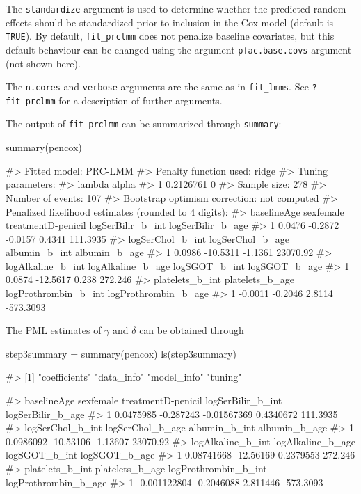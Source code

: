 The \texttt{standardize} argument is used to determine whether the
predicted random effects should be standardized prior to inclusion in
the Cox model (default is \texttt{TRUE}). By default,
\texttt{fit\_prclmm} does not penalize baseline covariates, but this
default behaviour can be changed using the argument
\texttt{pfac.base.covs} argument (not shown here).

The \texttt{n.cores} and \texttt{verbose} arguments are the same as in
\texttt{fit\_lmms}. See \texttt{?fit\_prclmm} for a description of
further arguments.

The output of \texttt{fit\_prclmm} can be summarized through
\texttt{summary}:

\begin{Schunk}
\begin{Sinput}
summary(pencox)
\end{Sinput}
\begin{Soutput}
#> Fitted model: PRC-LMM
#> Penalty function used: ridge
#> Tuning parameters:
#>      lambda alpha
#> 1 0.2126761     0
#> Sample size: 278
#> Number of events: 107
#> Bootstrap optimism correction: not computed
#> Penalized likelihood estimates (rounded to 4 digits):
#>   baselineAge sexfemale treatmentD-penicil logSerBilir_b_int logSerBilir_b_age
#> 1      0.0476   -0.2872            -0.0157            0.4341          111.3935
#>   logSerChol_b_int logSerChol_b_age albumin_b_int albumin_b_age
#> 1           0.0986         -10.5311       -1.1361      23070.92
#>   logAlkaline_b_int logAlkaline_b_age logSGOT_b_int logSGOT_b_age
#> 1            0.0874          -12.5617         0.238       272.246
#>   platelets_b_int platelets_b_age logProthrombin_b_int logProthrombin_b_age
#> 1         -0.0011         -0.2046               2.8114            -573.3093
\end{Soutput}
\end{Schunk}

The PML estimates of \(\gamma\) and \(\delta\) can be obtained through

\begin{Schunk}
\begin{Sinput}
step3summary = summary(pencox)
ls(step3summary)
\end{Sinput}
\begin{Soutput}
#> [1] "coefficients" "data_info"    "model_info"   "tuning"
\end{Soutput}
\begin{Soutput}
#>   baselineAge sexfemale treatmentD-penicil logSerBilir_b_int logSerBilir_b_age
#> 1   0.0475985 -0.287243        -0.01567369         0.4340672          111.3935
#>   logSerChol_b_int logSerChol_b_age albumin_b_int albumin_b_age
#> 1        0.0986092        -10.53106      -1.13607      23070.92
#>   logAlkaline_b_int logAlkaline_b_age logSGOT_b_int logSGOT_b_age
#> 1        0.08741668         -12.56169     0.2379553       272.246
#>   platelets_b_int platelets_b_age logProthrombin_b_int logProthrombin_b_age
#> 1    -0.001122804      -0.2046088             2.811446            -573.3093
\end{Soutput}
\end{Schunk}

